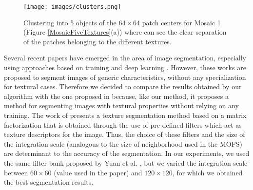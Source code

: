 \documentclass[10pt,twocolumn,letterpaper]{article}
\begin{document}
\begin{figure}[!t] 
\centering
\texttt{[image: images/clusters.png]}
\caption{Clustering into 5 objects of the $64 \times 64$ patch centers for Mosaic 1 (Figure \ref{MosaicFiveTextures}(a)) where can see the clear separation of the patches belonging to the different textures.}\label{fig:cluster01}
\end{figure}

Several recent papers have emerged in the area of image segmentation, especially using approaches based on training and deep learning \cite{SHEL17a, CIMP16a}. However, these works are proposed to segment images of generic characteristics, without any specialization for textural cases. Therefore we decided to compare the results obtained by our algorithm with the one proposed in \cite{YUAN15a} because, like our method, it proposes a method for segmenting images with textural properties without relying on any training.
The work of \cite{YUAN15a} presents a texture segmentation method based on a matrix factorization that is obtained through the use of pre-defined filters which act as texture descriptors for the image. Thus, the choice of these filters and the size of the integration scale (analogous to the size of neighborhood used in the MOFS) are determinant to the accuracy of the segmentation. In our experiments, we used the same filter bank proposed by Yuan et al. \cite{YUAN15a}, but we varied the integration scale between $60 \times 60$ (value used in the paper) and $120 \times 120$, for which we obtained the best segmentation results. %
\end{document}
